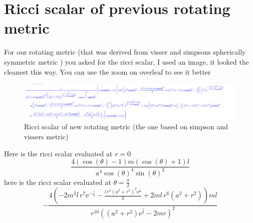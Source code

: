 \documentclass[a4paper,11pt]{article}
\begin{document}
\maketitle
\flushbottom
\pagebreak
\section{Ricci scalar of previous rotating metric }
For our rotating metric (that was derived from visser and simpsons spherically symmetric metric ) you asked for the ricci scalar, I used an image, it looked the cleanest this way. You can use the zoom on overleaf to see it better
\begin{figure}[h]

    \includegraphics[scale =0.47]{MF&DF_Graphs/RS_NM.png}
    \caption{Ricci scalar of new rotating metric (the one based on simpson and vissers metric)}
    \label{fig:my_label}
\end{figure}
Here is the ricci scalar evaluated at $r=0$
\begin{equation}
\frac{4 \left(\cos\! \left(\theta \right)-1\right) m \left(\cos\! \left(\theta \right)+1\right) l}{a^{4} \cos\! \left(\theta \right)^{4} \sin\! \left(\theta \right)^{2}}  
\end{equation}
here is the ricci scalar evaluated at $\theta = \frac{\pi}{2}$
\begin{equation}
 -\frac{4 \left(-2 m^{2} l \,r^{7} {\mathrm e}^{-\frac{l}{r}}-\frac{l \,r^{5} \left(a^{2}+r^{2}\right)^{2} {\mathrm e}^{\frac{l}{r}}}{2}+2 m l \,r^{6} \left(a^{2}+r^{2}\right)\right) m l}{r^{10} \left(\left(a^{2}+r^{2}\right) {\mathrm e}^{\frac{l}{r}}-2 m r\right)^{2}}   
\end{equation}
\end{document}

